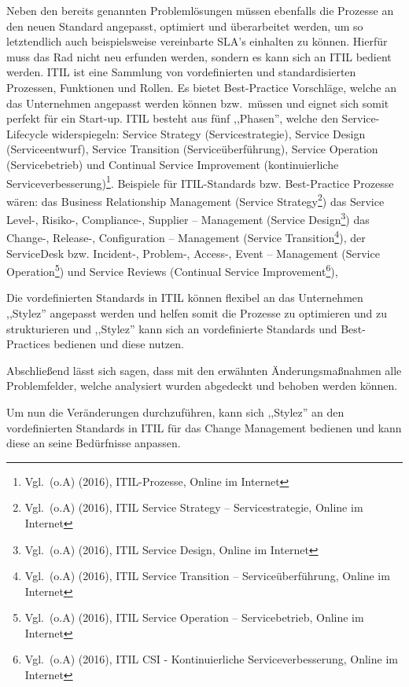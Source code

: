 Neben den bereits genannten Problemlösungen müssen ebenfalls die
Prozesse an den neuen Standard angepasst, optimiert und überarbeitet
werden, um so letztendlich auch beispielsweise vereinbarte \acrshort{SLA}’s
einhalten zu können. Hierfür muss das Rad nicht neu erfunden werden,
sondern es kann sich an ITIL bedient werden. ITIL ist eine Sammlung
von vordefinierten und standardisierten Prozessen, Funktionen und
Rollen. Es bietet Best-Practice Vorschläge, welche an das Unternehmen
angepasst werden können bzw.~müssen und eignet sich somit perfekt für
ein Start-up. ITIL besteht aus fünf ,,Phasen'', welche den
Service-Lifecycle widerspiegeln: Service Strategy (Servicestrategie),
Service Design (Serviceentwurf), Service Transition
(Serviceüberführung), Service Operation (Servicebetrieb) und Continual
Service Improvement (kontinuierliche
Serviceverbesserung)\footnote{Vgl.~(o.A) (2016), ITIL-Prozesse, Online
  im Internet}. Beispiele für ITIL-Standards bzw. Best-Practice
Prozesse wären: das Business Relationship Management (Service
Strategy\footnote{Vgl.~(o.A) (2016), ITIL Service Strategy –
  Servicestrategie, Online im Internet}) das Service Level-, Risiko-,
Compliance-, Supplier – Management (Service Design\footnote{Vgl.~(o.A)
  (2016), ITIL Service Design, Online im Internet}) das Change-,
Release-, Configuration – Management (Service
Transition\footnote{Vgl.~(o.A) (2016), ITIL Service Transition –
  Serviceüberführung, Online im Internet}), der ServiceDesk
bzw. Incident-, Problem-, Access-, Event – Management (Service
Operation\footnote{Vgl.~(o.A) (2016), ITIL Service Operation –
  Servicebetrieb, Online im Internet}) und Service Reviews (Continual
Service Improvement\footnote{Vgl.~(o.A) (2016), ITIL CSI -
  Kontinuierliche Serviceverbesserung, Online im Internet}),

Die vordefinierten Standards in ITIL können flexibel an das
Unternehmen ,,Stylez'' angepasst werden und helfen somit die Prozesse
zu optimieren und zu strukturieren und ,,Stylez'' kann sich an
vordefinierte Standards und Best-Practices bedienen und diese nutzen.

Abschließend lässt sich sagen, dass mit den erwähnten
Änderungsmaßnahmen alle Problemfelder, welche analysiert wurden
abgedeckt und behoben werden können.

Um nun die Veränderungen durchzuführen, kann sich ,,Stylez'' an den
vordefinierten Standards in ITIL für das Change Management bedienen
und kann diese an seine Bedürfnisse anpassen.
